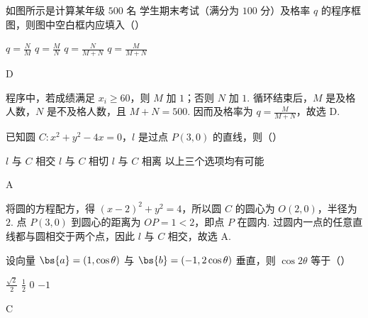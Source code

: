 \begin{problem}
如图所示是计算某年级 \(500\text{ 名}\) 学生期末考试（满分为 \(100\text{ 分}\)）及格率 \(q\) 的程序框图，则图中空白框内应填入（\quad）

\begin{minipage}{\linewidth}
\centering
{}
\end{minipage}

\choices
    {\(q = \frac{N}{M}\)}
    {\(q = \frac{M}{N}\)}
    {\(q = \frac{N}{M + N}\)}
    {\(q = \frac{M}{M + N}\)}
\end{problem}

\begin{answer}
D
\end{answer}

\begin{solution}
程序中，若成绩满足 \(x_i\geqslant60\)，则 \(M\) 加 \(1\)；否则 \(N\) 加 \(1\). 循环结束后，\(M\) 是及格人数，\(N\) 是不及格人数，且 \(M+N=500\). 因而及格率为 \(q=\frac{M}{M+N}\)，故选 D.
\end{solution}

\begin{problem}
已知圆 \(C: x^2 + y^2 - 4x = 0\)，\(l\) 是过点 \(P(3,0)\) 的直线，则（\quad）

\choices
    {\(l\) 与 \(C\) 相交}
    {\(l\) 与 \(C\) 相切}
    {\(l\) 与 \(C\) 相离}
    {以上三个选项均有可能}
\end{problem}

\begin{answer}
A
\end{answer}

\begin{solution}
将圆的方程配方，得 \((x-2)^2+y^2=4\)，所以圆 \(C\) 的圆心为 \(O(2,0)\)，半径为 \(2\). 点 \(P(3,0)\) 到圆心的距离为 \(OP=1<2\)，即点 \(P\) 在圆内. 过圆内一点的任意直线都与圆相交于两个点，因此 \(l\) 与 \(C\) 相交，故选 A.
\end{solution}

\begin{problem}
设向量 \(\bs{a} = (1, \cos \theta)\) 与 \(\bs{b} = (-1, 2 \cos \theta)\) 垂直，则 \(\cos 2\theta\) 等于（\quad）

\choices
    {\(\frac{\sqrt{2}}{2}\)}
    {\(\frac{1}{2}\)}
    {0}
    {\(-1\)}
\end{problem}

\begin{answer}
C
\end{answer}

